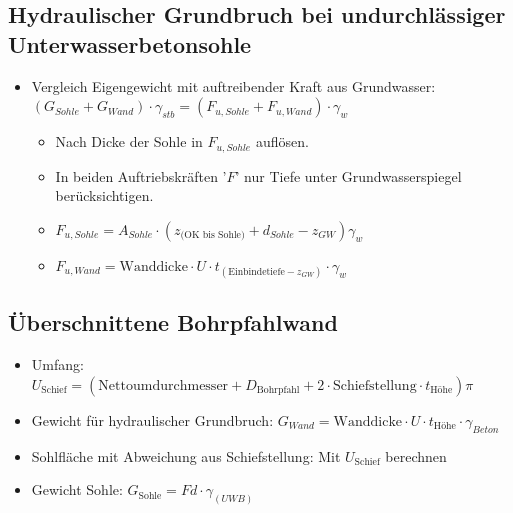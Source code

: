\documentclass[fleqn,twoside]{article}
\begin{document}
\subsection{Hydraulischer Grundbruch bei undurchlässiger Unterwasserbetonsohle}
\begin{itemize}
    \item Vergleich Eigengewicht mit auftreibender Kraft aus Grundwasser:\\ 
    $(G_{Sohle}+G_{Wand})\cdot \gamma_{stb}=(F_{u,Sohle} + F_{u,Wand}) \cdot \gamma_{w}$
        \begin{itemize}
            \item Nach Dicke der Sohle in $F_{u,Sohle}$ auflösen. 
            \item In beiden Auftriebskräften '$F$' nur Tiefe unter Grundwasserspiegel berücksichtigen.
            \item $F_{u,Sohle} = A_{Sohle} \cdot (z_{\text{(OK bis Sohle)}} + d_{Sohle} - z_{GW})\gamma_w$
            \item $F_{u,Wand} = \text{Wanddicke} \cdot U \cdot t_{(\text{Einbindetiefe}-z_{GW})} \cdot \gamma_w$
        \end{itemize}
\end{itemize}

\subsection{Überschnittene Bohrpfahlwand}
\begin{itemize}
    \item Umfang: $U_{\text{Schief}} = (\text{Nettoumdurchmesser} + D_{\text{Bohrpfahl}} + 2 \cdot \text{Schiefstellung} \cdot t_{\text{Höhe}}) \pi$
    \item Gewicht für hydraulischer Grundbruch: $ G_{Wand}= \text{Wanddicke} \cdot U \cdot t_{\text{Höhe}} \cdot \gamma_{Beton}$
    \item Sohlfläche mit Abweichung aus Schiefstellung: Mit $U_{\text{Schief}}$ berechnen
    \item Gewicht Sohle: $G_{\text{Sohle}} = Fd \cdot \gamma_{(UWB)}$
\end{itemize}
\end{document}
